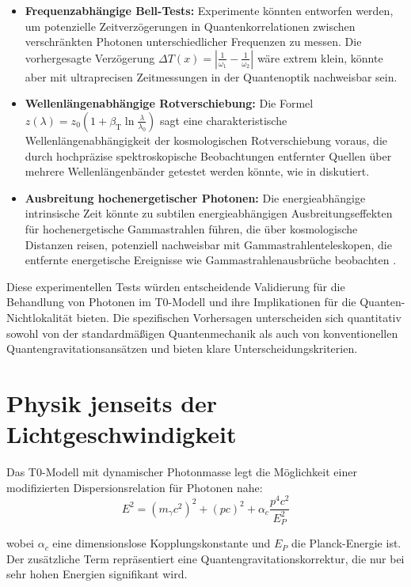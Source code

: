 \documentclass[12pt,a4paper]{article}
\newcommand{\Tfield}{T(x)}
\newcommand{\betaT}{\beta_{\text{T}}}
\begin{document}
	\begin{itemize}
		\item \textbf{Frequenzabhängige Bell-Tests:} Experimente könnten entworfen werden, um potenzielle Zeitverzögerungen in Quantenkorrelationen zwischen verschränkten Photonen unterschiedlicher Frequenzen zu messen. Die vorhergesagte Verzögerung \(\Delta \Tfield = \left|\frac{1}{\omega_1} - \frac{1}{\omega_2}\right|\) wäre extrem klein, könnte aber mit ultraprecisen Zeitmessungen in der Quantenoptik nachweisbar sein.
		
		\item \textbf{Wellenlängenabhängige Rotverschiebung:} Die Formel \(z(\lambda) = z_0 \left(1 + \betaT \ln\frac{\lambda}{\lambda_0}\right)\) sagt eine charakteristische Wellenlängenabhängigkeit der kosmologischen Rotverschiebung voraus, die durch hochpräzise spektroskopische Beobachtungen entfernter Quellen über mehrere Wellenlängenbänder getestet werden könnte, wie in \cite{pascher_messdifferenzen_2025} diskutiert.
		
		\item \textbf{Ausbreitung hochenergetischer Photonen:} Die energieabhängige intrinsische Zeit könnte zu subtilen energieabhängigen Ausbreitungseffekten für hochenergetische Gammastrahlen führen, die über kosmologische Distanzen reisen, potenziell nachweisbar mit Gammastrahlenteleskopen, die entfernte energetische Ereignisse wie Gammastrahlenausbrüche beobachten \cite{pascher_galaxies_2025}.
	\end{itemize}
	
	Diese experimentellen Tests würden entscheidende Validierung für die Behandlung von Photonen im T0-Modell und ihre Implikationen für die Quanten-Nichtlokalität bieten. Die spezifischen Vorhersagen unterscheiden sich quantitativ sowohl von der standardmäßigen Quantenmechanik als auch von konventionellen Quantengravitationsansätzen und bieten klare Unterscheidungskriterien.
	
	\section{Physik jenseits der Lichtgeschwindigkeit}
	Das T0-Modell mit dynamischer Photonmasse legt die Möglichkeit einer modifizierten Dispersionsrelation für Photonen nahe:
	\begin{equation}
		E^2 = (m_\gamma c^2)^2 + (p c)^2 + \alpha_c \frac{p^4 c^2}{E_P^2}
	\end{equation}
	
	wobei \(\alpha_c\) eine dimensionslose Kopplungskonstante und \(E_P\) die Planck-Energie ist. Der zusätzliche Term repräsentiert eine Quantengravitationskorrektur, die nur bei sehr hohen Energien signifikant wird.
	
\end{document}
